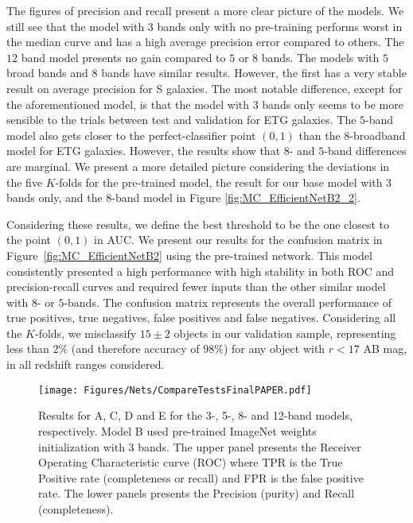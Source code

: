 \documentclass[fleqn,usenatbib]{mnras}
\begin{document}
The figures of precision and recall present a more clear picture of the models. We still see that the model with $3$ bands only with no pre-training performs worst in the median curve and has a high average precision error compared to others. The $12$ band model presents no gain compared to $5$ or $8$ bands.  The models with $5$ broad bands and $8$ bands have similar results. However, the first has a very stable result on average precision for S galaxies. The most notable difference, except for the aforementioned model, is that the model with $3$ bands only seems to be more sensible to the trials between test and validation for ETG galaxies. The $5$-band model also gets closer to the perfect-classifier point $(0,1)$ than the $8$-broadband model for ETG galaxies. However, the results show that $8$- and $5$-band differences are marginal. We present a more detailed picture considering the deviations in the five $K$-folds for the pre-trained model, the result for our base model with $3$ bands only, and the $8$-band model in Figure \ref{fig:MC_EfficientNetB2_2}.


Considering these results, we define the best threshold to be the one closest to the point $(0,1)$ in AUC. We present our results for the confusion matrix in Figure~\ref{fig:MC_EfficientNetB2} using the pre-trained network. This model consistently presented a high performance with high stability in both ROC and precision-recall curves and required fewer inputs than the other similar model with $8$- or $5$-bands. The confusion matrix represents the overall performance of true positives, true negatives, false positives and false negatives. Considering all the $K$-folds, we misclassify $15 \pm 2$ objects in our validation sample, representing less than $2\%$ (and therefore accuracy of $98\%$) for any  object with $r<17$ AB mag, in all redshift ranges considered.







\begin{figure*}
\centering
\texttt{[image: Figures/Nets/CompareTestsFinalPAPER.pdf]}
    \caption{
    \label{fig:MC_EfficientNetB2_1}
    Results for A, C, D and E for the 3-, 5-, 8- and 12-band models, respectively. Model B used pre-trained ImageNet weights initialization with $3$ bands. The upper panel presents the Receiver Operating Characteristic curve (ROC) where TPR is the True Positive rate (completeness or recall) and FPR is the false positive rate. The lower panels presents the Precision (purity) and Recall (completeness).
    }
\end{figure*}
\end{document}
